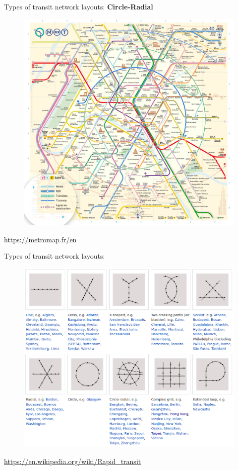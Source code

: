\documentclass[aspectratio=169]{beamer}
\begin{document}
\begin{frame}
	
	Types of transit network layouts: \textbf{Circle-Radial}
	
	\begin{figure}
		\centering
		\includegraphics[width=0.6\linewidth]{images/paris_metro.png}
	\end{figure}
	
	
	\tiny \url{https://metromap.fr/en}
\end{frame}




\begin{frame}
	
	Types of transit network layouts: 
	
	\begin{figure}
		\centering
		\includegraphics[width=0.6\linewidth]{images/network_designs.png}
	\end{figure}
	
	
	\tiny \url{https://en.wikipedia.org/wiki/Rapid_transit}
\end{frame}
\end{document}
